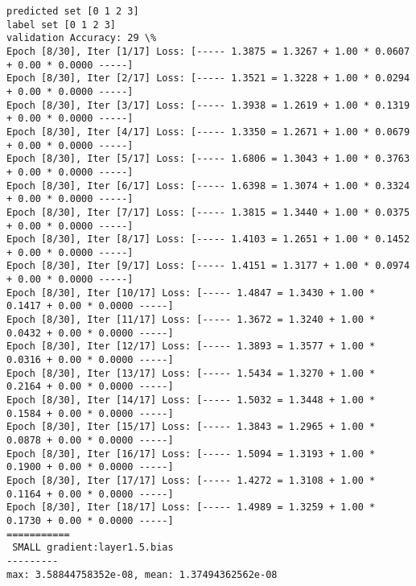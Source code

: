 \documentclass[11pt]{article}
\begin{document}
    \begin{Verbatim}[commandchars=\\\{\}]
predicted set [0 1 2 3]
label set [0 1 2 3]
validation Accuracy: 29 \%
Epoch [8/30], Iter [1/17] Loss: [----- 1.3875 = 1.3267 + 1.00 * 0.0607 + 0.00 * 0.0000 -----]
Epoch [8/30], Iter [2/17] Loss: [----- 1.3521 = 1.3228 + 1.00 * 0.0294 + 0.00 * 0.0000 -----]
Epoch [8/30], Iter [3/17] Loss: [----- 1.3938 = 1.2619 + 1.00 * 0.1319 + 0.00 * 0.0000 -----]
Epoch [8/30], Iter [4/17] Loss: [----- 1.3350 = 1.2671 + 1.00 * 0.0679 + 0.00 * 0.0000 -----]
Epoch [8/30], Iter [5/17] Loss: [----- 1.6806 = 1.3043 + 1.00 * 0.3763 + 0.00 * 0.0000 -----]
Epoch [8/30], Iter [6/17] Loss: [----- 1.6398 = 1.3074 + 1.00 * 0.3324 + 0.00 * 0.0000 -----]
Epoch [8/30], Iter [7/17] Loss: [----- 1.3815 = 1.3440 + 1.00 * 0.0375 + 0.00 * 0.0000 -----]
Epoch [8/30], Iter [8/17] Loss: [----- 1.4103 = 1.2651 + 1.00 * 0.1452 + 0.00 * 0.0000 -----]
Epoch [8/30], Iter [9/17] Loss: [----- 1.4151 = 1.3177 + 1.00 * 0.0974 + 0.00 * 0.0000 -----]
Epoch [8/30], Iter [10/17] Loss: [----- 1.4847 = 1.3430 + 1.00 * 0.1417 + 0.00 * 0.0000 -----]
Epoch [8/30], Iter [11/17] Loss: [----- 1.3672 = 1.3240 + 1.00 * 0.0432 + 0.00 * 0.0000 -----]
Epoch [8/30], Iter [12/17] Loss: [----- 1.3893 = 1.3577 + 1.00 * 0.0316 + 0.00 * 0.0000 -----]
Epoch [8/30], Iter [13/17] Loss: [----- 1.5434 = 1.3270 + 1.00 * 0.2164 + 0.00 * 0.0000 -----]
Epoch [8/30], Iter [14/17] Loss: [----- 1.5032 = 1.3448 + 1.00 * 0.1584 + 0.00 * 0.0000 -----]
Epoch [8/30], Iter [15/17] Loss: [----- 1.3843 = 1.2965 + 1.00 * 0.0878 + 0.00 * 0.0000 -----]
Epoch [8/30], Iter [16/17] Loss: [----- 1.5094 = 1.3193 + 1.00 * 0.1900 + 0.00 * 0.0000 -----]
Epoch [8/30], Iter [17/17] Loss: [----- 1.4272 = 1.3108 + 1.00 * 0.1164 + 0.00 * 0.0000 -----]
Epoch [8/30], Iter [18/17] Loss: [----- 1.4989 = 1.3259 + 1.00 * 0.1730 + 0.00 * 0.0000 -----]
===========
 SMALL gradient:layer1.5.bias
---------
max: 3.58844758352e-08, mean: 1.37494362562e-08

    \end{Verbatim}

    \begin{center}
    \end{center}
    { \hspace*{\fill} \\}
    
    \begin{center}
    \end{center}
    { \hspace*{\fill} \\}
    
\end{document}
